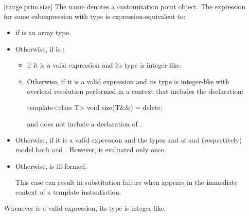 [range.prim.size]{}
\pnum
The name  denotes a customization point
object. The expression
 for some subexpression  with type
 is expression-equivalent to:
\begin{itemize}
\item
   if  is an array
  type.

\item
  Otherwise, if
  is :
  \begin{itemize}
  \item
    if it is a valid expression and its type 
    is integer-like.

  \item
    Otherwise, 
    if it is a valid expression and its type 
    is integer-like
    with overload resolution performed in a context that includes
    the declaration:
    \begin{codeblock}
template<class T> void size(T&&) = delete;
    \end{codeblock}
    and does not include a declaration of .
  \end{itemize}

\item
  Otherwise, 
  if it is a valid expression and
  the types  and  of  and
   (respectively) model both
   and
  .
  However,  is evaluated only once.

\item
  Otherwise,  is ill-formed.
  \begin{note}
  This case can result in substitution failure when 
  appears in the immediate context of a template instantiation.
  \end{note}
\end{itemize}

\pnum
\begin{note}
Whenever  is a valid expression, its
type is integer-like.
\end{note}

